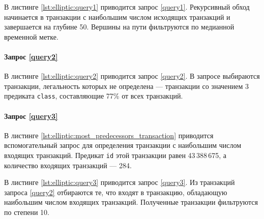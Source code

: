 В листинге \ref{lst:elliptic:query1} приводится запрос \ref{query1}. Рекурсивный обход начинается в транзакции с
наибольшим числом исходящих транзакций и завершается на глубине 50. Вершины на пути фильтруются по медианной временной
метке.


\paragraph{Запрос \ref{query2}}

В листинге \ref{lst:elliptic:query2} приводится запрос \ref{query2}. В запросе выбираются транзакции, легальность
которых не определена --- транзакции со значением 3 предиката \texttt{class}, составляющие 77\% от всех транзакций.


\paragraph{Запрос \ref{query3}}

В листинге \ref{lst:elliptic:most_predecessors_transaction} приводится вспомогательный запрос для определения
транзакции с наибольшим числом входящих транзакций. Предикат \texttt{id} этой транзакции равен 43\,388\,675, а
количество входящих транзакций --- 284.


В листинге \ref{lst:elliptic:query3} приводится запрос \ref{query3}. Из транзакций запроса \ref{query2} отбираются те,
что входят в транзакцию, обладающую наибольшим числом входящих транзакций. Полученные транзакции фильтруются по степени
10.


